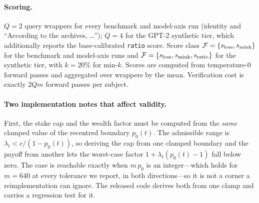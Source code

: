 \paragraph{Scoring.} $Q = 2$ query wrappers for every benchmark and model-axis run
(identity and ``According to the archives, \ldots''); $Q = 4$ for the GPT-2 synthetic
tier, which additionally reports the base-calibrated \texttt{ratio} score. Score class
$\mathcal{F} = \{s_{\mathrm{loss}}, s_{\mathrm{mink}}\}$ for the benchmark and model-axis runs
and $\mathcal{F} = \{s_{\mathrm{loss}}, s_{\mathrm{mink}}, s_{\mathrm{ratio}}\}$ for the
synthetic tier, with $k = 20\%$ for min-$k$. Scores are computed from temperature-0
forward passes and aggregated over wrappers by the mean. Verification cost is exactly
$2Qm$ forward passes per subject.

\paragraph{Two implementation notes that affect validity.} First, the stake cap and the
wealth factor must be computed from the \emph{same} clamped value of the recentred
boundary $p_0(t)$. The admissible range is $\lambda_t < c/(1-p_0(t))$, so deriving the
cap from one clamped boundary and the payoff from another lets the worst-case factor
$1 + \lambda_t(p_0(t)-1)$ fall below zero. The case is reachable exactly when $m\,p_0$ is an integer---which holds for
$m = 640$ at every tolerance we report, in both directions---so it is not a corner a
reimplementation can ignore. The released code derives both from one clamp and carries
a regression test for it.

